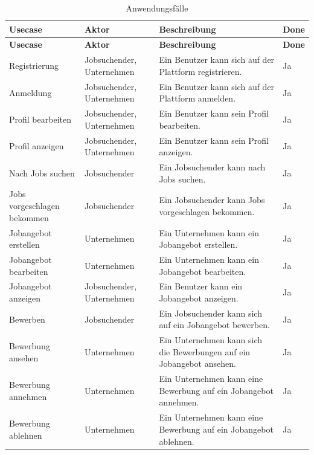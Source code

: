 \documentclass[12pt, letterpaper]{article}
\begin{document}
    \begin{longtable}[htbp]{|p{}|p{}|p{}|p{}|}
       
        \hline
        \textbf{Usecase}&\textbf{Aktor}&\textbf{Beschreibung}&\textbf{Done}\\
        \hline
        \hline
        \endfirsthead

        \hline
        \textbf{Usecase}&\textbf{Aktor}&\textbf{Beschreibung}&\textbf{Done}\\
        \hline
        \hline
        \endhead

        \hline
        \endfoot

        \hline
        \caption{Anwendungsfälle}  \label{tab:Anwendungsfaelle} 
        \endlastfoot
        Registrierung& Jobsuchender, Unternehmen & Ein Benutzer kann sich auf der Plattform registrieren. & Ja \\
        \hline
        Anmeldung& Jobsuchender, Unternehmen & Ein Benutzer kann sich auf der Plattform anmelden. & Ja \\
        \hline
        Profil bearbeiten& Jobsuchender, Unternehmen & Ein Benutzer kann sein Profil bearbeiten. & Ja \\
        \hline
        Profil anzeigen& Jobsuchender, Unternehmen & Ein Benutzer kann sein Profil anzeigen. & Ja \\
        \hline
        Nach Jobs suchen& Jobsuchender & Ein Jobsuchender kann nach Jobs suchen. & Ja \\
        \hline
        Jobs vorgeschlagen bekommen& Jobsuchender & Ein Jobsuchender kann Jobs vorgeschlagen bekommen. & Ja \\
        \hline
        Jobangebot erstellen& Unternehmen & Ein Unternehmen kann ein Jobangebot erstellen. & Ja \\
        \hline
        Jobangebot bearbeiten& Unternehmen & Ein Unternehmen kann ein Jobangebot bearbeiten. & Ja \\
        \hline
        Jobangebot anzeigen& Jobsuchender, Unternehmen & Ein Benutzer kann ein Jobangebot anzeigen. & Ja \\
        \hline
        Bewerben& Jobsuchender & Ein Jobsuchender kann sich auf ein Jobangebot bewerben. & Ja \\
        \hline
        Bewerbung ansehen& Unternehmen & Ein Unternehmen kann sich die Bewerbungen auf ein Jobangebot ansehen. & Ja \\
        \hline
        Bewerbung annehmen& Unternehmen & Ein Unternehmen kann eine Bewerbung auf ein Jobangebot annehmen. & Ja \\
        \hline
        Bewerbung ablehnen& Unternehmen & Ein Unternehmen kann eine Bewerbung auf ein Jobangebot ablehnen. & Ja \\
    \end{longtable}
    \newpage
\end{document}
